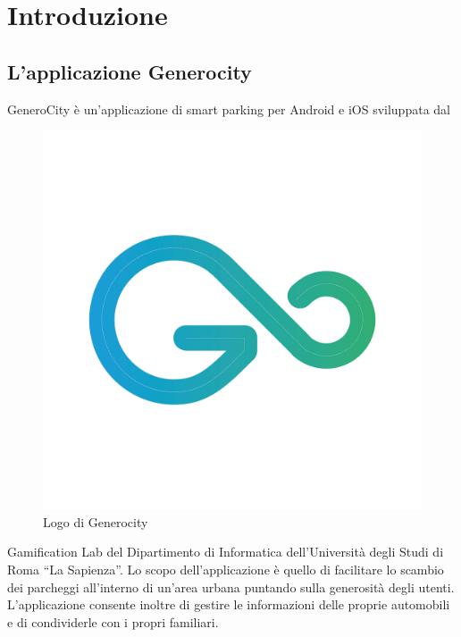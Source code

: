 \documentclass[main.tex]{subfiles}
\begin{document}
\sloppy


\vspace{1.0cm}

\chapter{Introduzione}\label{sec:Introduzione}
\section{L’applicazione Generocity}

GeneroCity \cite{Generocity} è un’applicazione di smart parking per Android e iOS sviluppata dal  
\begin{figure}
    \centering
    \captionsetup{justification=centering}
    \includegraphics[scale=0.07]{img/introduzione/logoColori.png}
    \caption{Logo di Generocity}
    \label{fig:generocityLogo}
\end{figure}
Gamification Lab del Dipartimento di Informatica dell’Università degli Studi di Roma “La Sapienza”.\newline
Lo scopo dell'applicazione è quello di facilitare lo scambio dei parcheggi all’interno di un’area urbana puntando sulla generosità degli utenti.\newline
L’applicazione consente inoltre di gestire le informazioni delle proprie automobili e di condividerle con i propri familiari.
\end{document}
